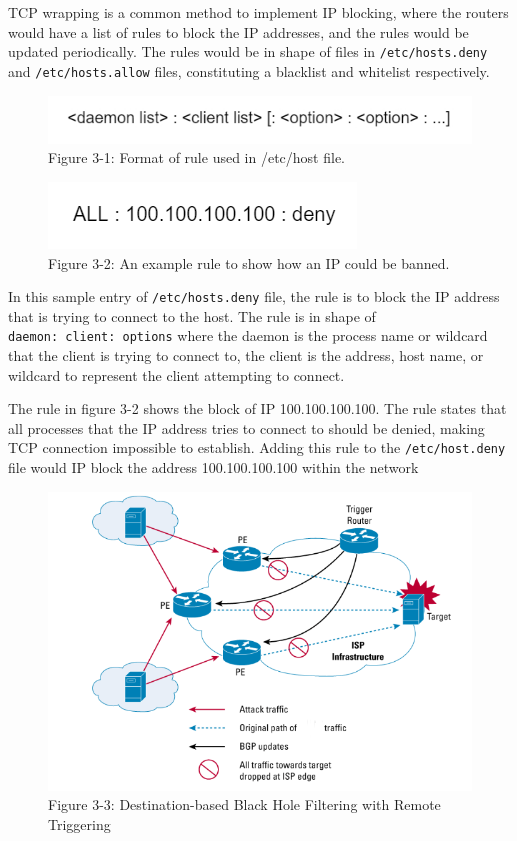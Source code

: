 TCP wrapping is a common method to implement IP blocking, where the
routers would have a list of rules to block the IP addresses, and the
rules would be updated periodically. The rules would be in shape of
files in \texttt{/etc/hosts.deny} and \texttt{/etc/hosts.allow} files,
constituting a blacklist and whitelist respectively.

\begin{figure}
\centering
\includegraphics{res/3.1-etc-host.jpg}
\caption{Figure 3-1: Format of rule used in /etc/host file.}
\end{figure}

\begin{figure}
\centering
\includegraphics{res/3.2-rule.png}
\caption{Figure 3-2: An example rule to show how an IP could be banned.}
\end{figure}

In this sample entry of \texttt{/etc/hosts.deny} file, the rule is to
block the IP address that is trying to connect to the host. The rule is
in shape of \texttt{daemon:\ client:\ options} where the daemon is the
process name or wildcard that the client is trying to connect to, the
client is the address, host name, or wildcard to represent the client
attempting to connect. \cite{12_hostman}

The rule in figure 3-2 shows the block of IP 100.100.100.100. The rule
states that all processes that the IP address tries to connect to should
be denied, making TCP connection impossible to establish. Adding this
rule to the \texttt{/etc/host.deny} file would IP block the address
100.100.100.100 within the network

\begin{figure}
\centering
\includegraphics{res/3-3-cisco.png}
\caption{Figure 3-3: Destination-based Black Hole Filtering with Remote
Triggering}
\end{figure}


